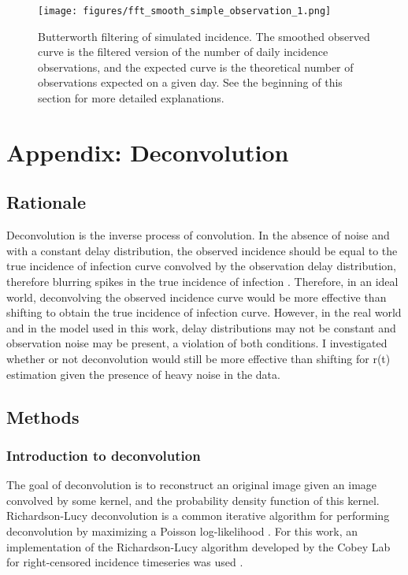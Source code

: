 \documentclass{article}
\begin{document}
\clearpage
\begin{figure}[h!]
    \centering
    \texttt{[image: figures/fft\_smooth\_simple\_observation\_1.png]}
    \caption{Butterworth filtering of simulated incidence. The smoothed observed curve is the filtered version of the number of daily incidence observations, and the expected curve is the theoretical number of observations expected on a given day. See the beginning of this section for more detailed explanations.}
\end{figure}



\section{Appendix: Deconvolution}
\subsection{Rationale}
Deconvolution is the inverse process of convolution. In the absence of noise and with a constant delay distribution, the observed incidence should be equal to the true incidence of infection curve convolved by the observation delay distribution, therefore blurring spikes in the true incidence of infection \cite{Gostic}. Therefore, in an ideal world, deconvolving the observed incidence curve would be more effective than shifting to obtain the true incidence of infection curve. However, in the real world and in the model used in this work, delay distributions may not be constant and observation noise may be present, a violation of both conditions. I investigated whether or not deconvolution would still be more effective than shifting for r(t) estimation given the presence of heavy noise in the data.

\subsection{Methods}
\subsubsection{Introduction to deconvolution}
The goal of deconvolution is to reconstruct an original image given an image convolved by some kernel, and the probability density function of this kernel. Richardson-Lucy deconvolution is a common iterative algorithm for performing deconvolution by maximizing a Poisson log-likelihood \cite{RLLoss}. For this work, an implementation of the Richardson-Lucy algorithm developed by the Cobey Lab for right-censored incidence timeseries was used \cite{Gostic}.
\end{document}
